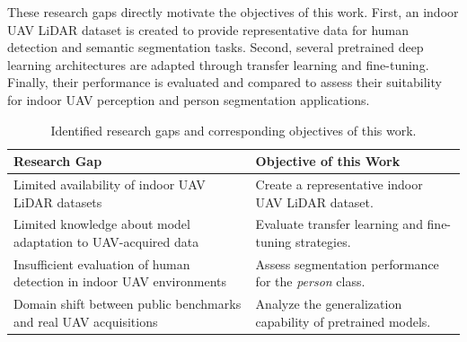 These research gaps directly motivate the objectives of this work. First, an indoor UAV LiDAR dataset is created to provide representative data for human detection and semantic segmentation tasks. Second, several pretrained deep learning architectures are adapted through transfer learning and fine-tuning. Finally, their performance is evaluated and compared to assess their suitability for indoor UAV perception and person segmentation applications.

\begin{table}[H]
\centering
\caption{Identified research gaps and corresponding objectives of this work.}
\label{tab:research_gap}
\begin{tabular}{|p{6cm}|p{7cm}|}
\hline
\textbf{Research Gap} & \textbf{Objective of this Work} \\
\hline
Limited availability of indoor UAV LiDAR datasets &
Create a representative indoor UAV LiDAR dataset. \\
\hline
Limited knowledge about model adaptation to UAV-acquired data &
Evaluate transfer learning and fine-tuning strategies. \\
\hline
Insufficient evaluation of human detection in indoor UAV environments &
Assess segmentation performance for the \textit{person} class. \\
\hline
Domain shift between public benchmarks and real UAV acquisitions &
Analyze the generalization capability of pretrained models. \\
\hline
\end{tabular}
\end{table}
